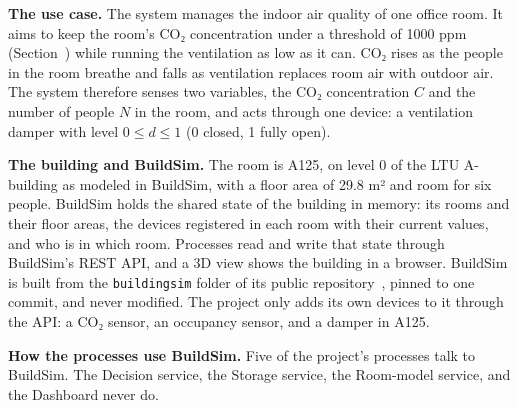 \documentclass[11pt]{article}
\def\ref#1{\getrefnumber{#1}}%
\begin{document}

\textbf{The use case.} The system manages the indoor air quality of one
office room. It aims to keep the room's CO₂ concentration under a threshold of 1000 ppm
(Section~\ref{sec:requirements}) while running the ventilation as low as it can. CO₂ rises
as the people in the room breathe and falls as ventilation replaces room
air with outdoor air. The system therefore senses two variables, the CO₂
concentration $C$ and the number of people $N$ in the room, and acts
through one device: a ventilation damper with level $0 \leq d \leq 1$
(0 closed, 1 fully open).

\textbf{The building and BuildSim.} The room is A125, on level 0 of the
LTU A-building as modeled in BuildSim, with a floor area of 29.8 m² and
room for six people. BuildSim holds the shared state of the building in memory:
its rooms and their floor areas, the devices registered in each room with
their current values, and who is in which room. Processes read and write
that state through BuildSim's REST API, and a 3D view shows the building in a
browser. BuildSim is built from the \texttt{buildingsim} folder of its
public repository~\cite{buildsim}, pinned to one commit, and never
modified. The project only adds
its own devices to it through the API: a CO₂ sensor, an occupancy sensor,
and a damper in A125.

\textbf{How the processes use BuildSim.} Five of the project's processes
talk to BuildSim. The Decision service, the Storage service, the
Room-model service, and the Dashboard never do.
\end{document}
